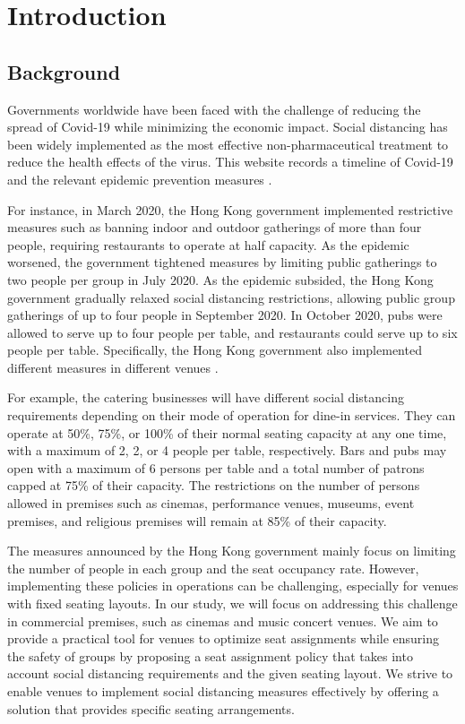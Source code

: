 \section{Introduction}

\subsection{Background}
Governments worldwide have been faced with the challenge of reducing the spread of Covid-19 while minimizing the economic impact. Social distancing has been widely implemented as the most effective non-pharmaceutical treatment to reduce the health effects of the virus. This website records a timeline of Covid-19 and the relevant epidemic prevention measures \cite{Covid19Timeline}. 

For instance, in March 2020, the Hong Kong government implemented restrictive measures such as banning indoor and outdoor gatherings of more than four people, requiring restaurants to operate at half capacity. As the epidemic worsened, the government tightened measures by limiting public gatherings to two people per group in July 2020. As the epidemic subsided, the Hong Kong government gradually relaxed social distancing restrictions, allowing public group gatherings of up to four people in September 2020. In October 2020, pubs were allowed to serve up to four people per table, and restaurants could serve up to six people per table. Specifically, the Hong Kong government also implemented different measures in different venues \cite{Gov202209}.

For example, the catering businesses will have different social distancing requirements depending on their mode of operation for dine-in services. They can operate at 50\%, 75\%, or 100\% of their normal seating capacity at any one time, with a maximum of 2, 2, or 4 people per table, respectively. Bars and pubs may open with a maximum of 6 persons per table and a total number of patrons capped at 75\% of their capacity. The restrictions on the number of persons allowed in premises such as cinemas, performance venues, museums, event premises, and religious premises will remain at 85\% of their capacity.

The measures announced by the Hong Kong government mainly focus on limiting the number of people in each group and the seat occupancy rate. However, implementing these policies in operations can be challenging, especially for venues with fixed seating layouts. In our study, we will focus on addressing this challenge in commercial premises, such as cinemas and music concert venues. We aim to provide a practical tool for venues to optimize seat assignments while ensuring the safety of groups by proposing a seat assignment policy that takes into account social distancing requirements and the given seating layout. We strive to enable venues to implement social distancing measures effectively by offering a solution that provides specific seating arrangements.

